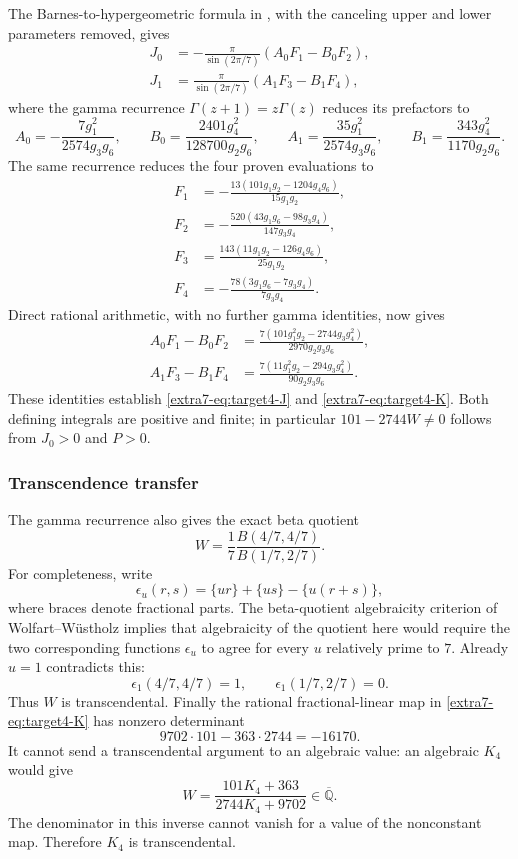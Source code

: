 \documentclass[11pt,a4paper]{article}
\theoremstyle{definition}
\theoremstyle{remark}
\numberwithin{equation}{section}
\begin{document}
The Barnes-to-hypergeometric formula in \cite[p.~3]{extra8-zudilin}, with the
canceling upper and lower parameters removed, gives
\begin{align*}
 J_0&=-\frac{\pi}{\sin(2\pi/7)}(A_0F_1-B_0F_2),\\
 J_1&=\frac{\pi}{\sin(2\pi/7)}(A_1F_3-B_1F_4),
\end{align*}
where the gamma recurrence $\Gamma(z+1)=z\Gamma(z)$ reduces its prefactors to
\[
 A_0=-\frac{7g_1^2}{2574g_3g_6},\qquad
 B_0=\frac{2401g_4^2}{128700g_2g_6},\qquad
 A_1=\frac{35g_1^2}{2574g_3g_6},\qquad
 B_1=\frac{343g_4^2}{1170g_2g_6}.
\]
The same recurrence reduces the four proven evaluations to
\begin{align*}
 F_1&=-\frac{13(101g_1g_2-1204g_4g_6)}{15g_1g_2},\\
 F_2&=-\frac{520(43g_1g_6-98g_3g_4)}{147g_3g_4},\\
 F_3&=\frac{143(11g_1g_2-126g_4g_6)}{25g_1g_2},\\
 F_4&=-\frac{78(3g_1g_6-7g_3g_4)}{7g_3g_4}.
\end{align*}
Direct rational arithmetic, with no further gamma identities, now gives
\begin{align*}
 A_0F_1-B_0F_2
   &=\frac{7(101g_1^2g_2-2744g_3g_4^2)}{2970g_2g_3g_6},\\
 A_1F_3-B_1F_4
   &=\frac{7(11g_1^2g_2-294g_3g_4^2)}{90g_2g_3g_6}.
\end{align*}
These identities establish \eqref{extra7-eq:target4-J} and \eqref{extra7-eq:target4-K}.
Both defining integrals are positive and finite; in particular
$101-2744W\ne0$ follows from $J_0>0$ and $P>0$.

\subsubsection{Transcendence transfer}

The gamma recurrence also gives the exact beta quotient
\[
 W=\frac17\frac{B(4/7,4/7)}{B(1/7,2/7)}.
\]
For completeness, write
\[
 \epsilon_u(r,s)=\{ur\}+\{us\}-\{u(r+s)\},
\]
where braces denote fractional parts. The beta-quotient algebraicity
criterion of Wolfart--W\"ustholz \cite{dbkz-ww} implies that algebraicity of the
quotient here would require the two corresponding functions
$\epsilon_u$ to agree for every $u$ relatively prime to $7$. Already $u=1$
contradicts this:
\[
 \epsilon_1(4/7,4/7)=1,\qquad
 \epsilon_1(1/7,2/7)=0.
\]
Thus $W$ is transcendental. Finally the rational fractional-linear map in
\eqref{extra7-eq:target4-K} has nonzero determinant
\[
 9702\cdot101-363\cdot2744=-16170.
\]
It cannot send a transcendental argument to an algebraic value: an
algebraic $K_4$ would give
\[
 W=\frac{101K_4+363}{2744K_4+9702}\in\overline{\mathbb Q}.
\]
The denominator in this inverse cannot vanish for a value of the
nonconstant map. Therefore $K_4$ is transcendental.
\end{document}
